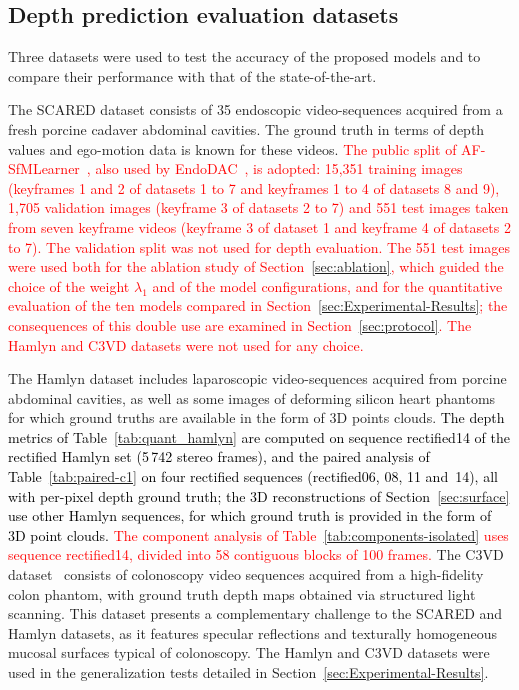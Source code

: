 \documentclass[a4paper,fleqn]{cas-dc}
\begin{document}
{\subsection{Depth prediction evaluation datasets}
Three datasets were used to test the accuracy of the proposed models and to compare their performance with that of the state-of-the-art. 

The SCARED dataset consists of 35 endoscopic video-sequences acquired from a fresh porcine cadaver abdominal cavities. The ground truth in terms of depth values and ego-motion data is known for these videos. \textcolor{red}{The public split of AF-SfMLearner~\citep{Shao_MIA_2022}, also used by EndoDAC~\citep{EndoDAC_MICCAI_2024}, is adopted: 15,351 training images (keyframes 1 and 2 of datasets 1 to 7 and keyframes 1 to 4 of datasets 8 and 9), 1,705 validation images (keyframe 3 of datasets 2 to 7) and 551 test images taken from seven keyframe videos (keyframe 3 of dataset 1 and keyframe 4 of datasets 2 to 7). The validation split was not used for depth evaluation. The 551 test images were used both for the ablation study of Section~\ref{sec:ablation}, which guided the choice of the weight $\lambda_1$ and of the model configurations, and for the quantitative evaluation of the ten models compared in Section~\ref{sec:Experimental-Results}; the consequences of this double use are examined in Section~\ref{sec:protocol}. The Hamlyn and C3VD datasets were not used for any choice.}


The Hamlyn dataset \citep{Recasens_IEEERAL_2021} includes laparoscopic video-sequences acquired from porcine abdominal cavities, as well as some images of deforming silicon heart phantoms for which ground truths are available in the form of 3D points clouds. \textcolor{black}{ The depth metrics of Table~\ref{tab:quant_hamlyn} are computed on sequence rectified14 of the rectified Hamlyn set (5\,742 stereo frames), and the paired analysis of Table~\ref{tab:paired-c1} on four rectified sequences (rectified06, 08, 11 and~14), all with per-pixel depth ground truth; the 3D reconstructions of Section~\ref{sec:surface} use other Hamlyn sequences, for which ground truth is provided in the form of 3D point clouds.} \textcolor{red}{The component analysis of Table~\ref{tab:components-isolated} uses sequence rectified14, divided into 58 contiguous blocks of 100 frames.} The C3VD dataset~\citep{bobrow2023colonoscopy} consists of colonoscopy video sequences acquired from a 
high-fidelity colon phantom, with ground truth depth maps obtained via structured light scanning. This dataset presents a complementary challenge to the SCARED and Hamlyn datasets, as it features specular reflections and texturally homogeneous mucosal surfaces typical of colonoscopy. The Hamlyn and C3VD datasets were used in the generalization tests detailed in 
Section~\ref{sec:Experimental-Results}. 

}
\end{document}
